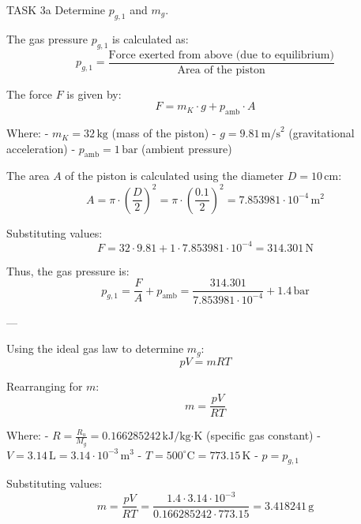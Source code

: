 TASK 3a  
Determine \( p_{g,1} \) and \( m_g \).  

The gas pressure \( p_{g,1} \) is calculated as:  
\[
p_{g,1} = \frac{\text{Force exerted from above (due to equilibrium)}}{\text{Area of the piston}}  
\]

The force \( F \) is given by:  
\[
F = m_K \cdot g + p_{\text{amb}} \cdot A  
\]

Where:  
- \( m_K = 32 \, \text{kg} \) (mass of the piston)  
- \( g = 9.81 \, \text{m/s}^2 \) (gravitational acceleration)  
- \( p_{\text{amb}} = 1 \, \text{bar} \) (ambient pressure)  

The area \( A \) of the piston is calculated using the diameter \( D = 10 \, \text{cm} \):  
\[
A = \pi \cdot \left(\frac{D}{2}\right)^2 = \pi \cdot \left(\frac{0.1}{2}\right)^2 = 7.853981 \cdot 10^{-4} \, \text{m}^2  
\]

Substituting values:  
\[
F = 32 \cdot 9.81 + 1 \cdot 7.853981 \cdot 10^{-4} = 314.301 \, \text{N}  
\]

Thus, the gas pressure is:  
\[
p_{g,1} = \frac{F}{A} + p_{\text{amb}} = \frac{314.301}{7.853981 \cdot 10^{-4}} + 1.4 \, \text{bar}  
\]

---

Using the ideal gas law to determine \( m_g \):  
\[
pV = mRT  
\]

Rearranging for \( m \):  
\[
m = \frac{pV}{RT}  
\]

Where:  
- \( R = \frac{R_u}{M_g} = 0.166285242 \, \text{kJ/kg·K} \) (specific gas constant)  
- \( V = 3.14 \, \text{L} = 3.14 \cdot 10^{-3} \, \text{m}^3 \)  
- \( T = 500^\circ\text{C} = 773.15 \, \text{K} \)  
- \( p = p_{g,1} \)  

Substituting values:  
\[
m = \frac{pV}{RT} = \frac{1.4 \cdot 3.14 \cdot 10^{-3}}{0.166285242 \cdot 773.15} = 3.418241 \, \text{g}  
\]